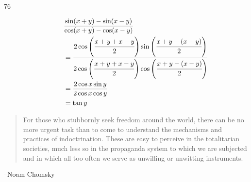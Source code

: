 \documentclass{exam}
\begin{document}
\begin{description}
      \item[76]
        \begin{align*}
          & \frac{\sin (x + y) - \sin (x - y)}{\cos (x + y) - \cos (x - y)} \\
            & = \frac{2 \cos \left( \cfrac{x + y + x - y}{2} \right) \sin \left( \cfrac{x + y - (x - y)}{2} \right)}
                     {2 \cos \left( \cfrac{x + y + x - y}{2} \right) \cos \left( \cfrac{x + y - (x - y)}{2} \right)} \\
            & = \frac{2 \cos x \sin y}{2 \cos x \cos y} \\
            & = \tan y \\
        \end{align*}

    \end{description}

  \else
    \vspace{9 cm}

    \begin{quote}
      \begin{em}
	For those who stubbornly seek freedom around the world, there can be no more
	urgent task than to come to understand the mechanisms and practices of
	indoctrination. These are easy to perceive in the totalitarian societies, much
	less so in the propaganda system to which we are subjected and in which all too
	often we serve as unwilling or unwitting instruments.
      \end{em}
    \end{quote}
    \hspace{1 cm} --Noam Chomsky
  \fi
\end{document}

